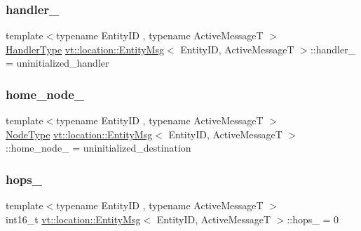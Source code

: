 \mbox{\label{structvt_1_1location_1_1_entity_msg_a13540b561e587b92c4ff43656e022bb0}} 
\subsubsection{\texorpdfstring{handler\+\_\+}{handler\_}}
{\footnotesize\ttfamily template$<$typename Entity\+ID , typename Active\+MessageT $>$ \\
\hyperlink{namespacevt_af64846b57dfcaf104da3ef6967917573}{Handler\+Type} \hyperlink{structvt_1_1location_1_1_entity_msg}{vt\+::location\+::\+Entity\+Msg}$<$ Entity\+ID, Active\+MessageT $>$\+::handler\+\_\+ = uninitialized\+\_\+handler\hspace{0.3cm}{\ttfamily [private]}}

\mbox{\label{structvt_1_1location_1_1_entity_msg_a013a64971bd245f15f12aed3609d27e9}} 
\subsubsection{\texorpdfstring{home\+\_\+node\+\_\+}{home\_node\_}}
{\footnotesize\ttfamily template$<$typename Entity\+ID , typename Active\+MessageT $>$ \\
\hyperlink{namespacevt_a866da9d0efc19c0a1ce79e9e492f47e2}{Node\+Type} \hyperlink{structvt_1_1location_1_1_entity_msg}{vt\+::location\+::\+Entity\+Msg}$<$ Entity\+ID, Active\+MessageT $>$\+::home\+\_\+node\+\_\+ = uninitialized\+\_\+destination\hspace{0.3cm}{\ttfamily [private]}}

\mbox{\label{structvt_1_1location_1_1_entity_msg_a7703bd3911f04d9c0eff0eab58bf677c}} 
\subsubsection{\texorpdfstring{hops\+\_\+}{hops\_}}
{\footnotesize\ttfamily template$<$typename Entity\+ID , typename Active\+MessageT $>$ \\
int16\+\_\+t \hyperlink{structvt_1_1location_1_1_entity_msg}{vt\+::location\+::\+Entity\+Msg}$<$ Entity\+ID, Active\+MessageT $>$\+::hops\+\_\+ = 0\hspace{0.3cm}{\ttfamily [private]}}

